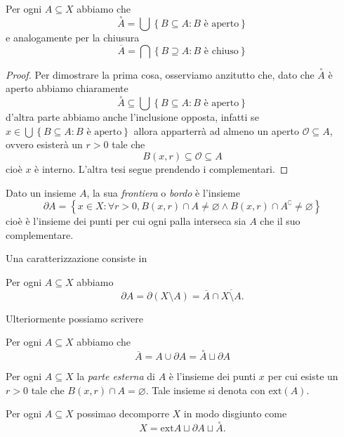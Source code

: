 \documentclass[11pt]{scrartcl}
\newcommand{\eset}{\varnothing}
\begin{document}
	\begin{proposition}
		Per ogni $A\subseteq X$ abbiamo che
		$$\overset{\circ}{A}=\bigcup \left\{B\subseteq A:B\text{ è aperto}\right\}$$
		e analogamente per la chiusura
		$$\overline{A}= \bigcap \left\{B\supseteq A:B\text{ è chiuso}\right\}$$
	\end{proposition}
	\begin{proof}
		Per dimostrare la prima cosa, osserviamo anzitutto che, dato che $\overset{\circ}{A}$ è aperto abbiamo chiaramente 
		$$\overset{\circ}{A}\subseteq \bigcup \left\{B\subseteq A:B\text{ è aperto}\right\}$$
		d'altra parte abbiamo anche l'inclusione opposta, infatti se $x\in \bigcup\left\{B\subseteq A:B\text{ è aperto}\right\}$ allora apparterrà ad almeno un aperto $\mathcal{O}\subseteq A$, ovvero esisterà un $r>0$ tale che
		$$B(x,r)\subseteq \mathcal{O}\subseteq A$$
		cioè $x$ è interno. L'altra tesi segue prendendo i complementari.
	\end{proof}
	\begin{definition}[Frontiera]
		Dato un insieme $A$, la sua \textit{frontiera} o \textit{bordo} è l'insieme 
		$$\partial A =\left\{x\in X:\forall r>0, B(x,r)\cap A \ne \eset \land B(x,r)\cap A^\complement \ne \eset\right\}$$
		cioè è l'insieme dei punti per cui ogni palla interseca sia $A$ che il suo complementare.
	\end{definition}
	Una caratterizzazione consiste in 
	\begin{remark}
		Per ogni $A\subseteq X$ abbiamo 
		$$\partial A = \partial\left(X\setminus A\right)=\overline{A}\cap \overline{X\setminus A}.$$
	\end{remark}
	Ulteriormente possiamo scrivere
	\begin{remark}
		Per ogni $A\subseteq X$ abbiamo che
		$$\overline{A}=A\cup \partial A=\overset{\circ}{A}\sqcup \partial A$$
	\end{remark}
	
	\begin{definition}
		Per ogni $A\subseteq X$ la \textit{parte esterna} di $A$ è l'insieme dei punti $x$ per cui esiste un $r>0$ tale che $B(x,r)\cap A =\eset$. Tale insieme si denota con $\text{ext}(A)$. 
	\end{definition}
	
	\begin{remark}
		Per ogni $A\subseteq X$ possimao decomporre $X$ in modo disgiunto come
		$$X=\text{ext}A \sqcup \partial A \sqcup \overset{\circ}{A}.$$
	\end{remark}
	
\end{document}
